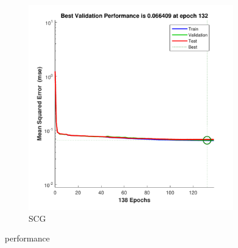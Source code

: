 \documentclass[12pt,a4paper]{article}
\begin{document}
\begin{CJK}{UTF8}{bsmi}
\begin{enumerate}
\begin{enumerate}
\begin{figure}[H]
\begin{subfigure}{.5\textwidth}
	 		\end{subfigure}%
	 		\begin{subfigure}{.5\textwidth}
	 			\centering
	 			\includegraphics[width=1\linewidth]{yeast_scg_per}
	 			\caption{SCG}
	 			
	 		\end{subfigure}
	 		\caption{performance}
	 		
	 	\end{figure}
	 	

\end{enumerate}
\end{enumerate}
\end{CJK}
\end{document}
